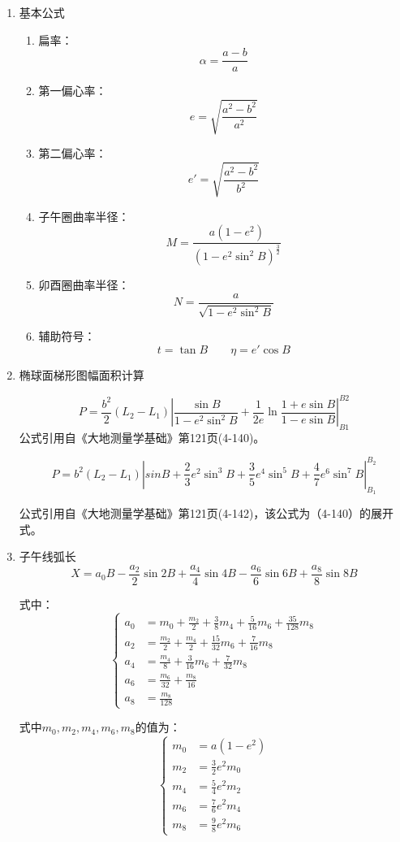 \begin{enumerate}

\item 基本公式

\begin{enumerate}
\item 扁率：
$$\alpha=\frac{a-b}{a}$$

\item 第一偏心率：
$$e=\sqrt{\frac{a^2-b^2}{a^2}}$$

\item 第二偏心率：
$$e'=\sqrt{\frac{a^{2}-b^{2}}{b^{2}}}$$

\item 子午圈曲率半径：
$$M=\frac{a(1-e^2)}{(1-e^2\sin ^2 B)^{\frac{3}{2}}}$$

\item 卯酉圈曲率半径：
$$N=\frac{a}{\sqrt{1-e^2\sin^2 B}}$$

\item 辅助符号：
$$t=\tan B\qquad\eta=e'\cos B$$
\end{enumerate}

\item 椭球面梯形图幅面积计算

$$P = \frac{b^2}{2}(L_2 - L_1) \left | \frac{\sin B}{1-e^2\sin^2 B} + \frac{1}{2e}\ln \frac{1+e\sin B}{1-e\sin B}\right |_{B1} ^{B2} $$
公式引用自《大地测量学基础》第121页(4-140)。

$$P=b^2(L_2 - L_1) \left | sinB + \frac{2}{3}e^2 \sin ^3 B + \frac{3}{5}e^4 \sin^5 B + \frac{4}{7}e^6 \sin ^7 B \right | _{B_1} ^{B_2}$$

公式引用自《大地测量学基础》第121页(4-142)，该公式为（4-140）的展开式。

\item 子午线弧长
$$X=a_0 B - \frac{a_2}{2}\sin 2B + \frac{a_4}{4}\sin 4B
- \frac{a_6}{6} \sin 6B  + \frac{a_8}{8}\sin 8B$$

式中：
\[
\left \{ \begin{aligned}
a_0 &= m_0 + \frac{m_2}{2} + \frac{3}{8}m_4 + \frac{5}{16}m_6 + \frac{35}{128}m_8  \\
a_2 &= \frac{m_2}{2} + \frac{m_4}{2} + \frac{15}{32}m_6 + \frac{7}{16}m_8  \\
a_4 &= \frac{m_4}{8} + \frac{3}{16}m_6 + \frac{7}{32}m_8  \\
a_6 &= \frac{m_6}{32} + \frac{m_8}{16}  \\
a_8 &= \frac{m_8}{128}
\end{aligned} \right.
\]

式中$m_0, m_2, m_4, m_6, m_8$的值为：
\[
\left \{ \begin{aligned}
m_0 &= a(1-e^2) \\
m_2 &= \frac{3}{2}e^2 m_0  \\
m_4 &= \frac{5}{4}e^2 m_2   \\
m_6 &= \frac{7}{6}e^2 m_4   \\
m_8 &= \frac{9}{8}e^2 m_6
\end{aligned} \right.
\]


\end{enumerate}
